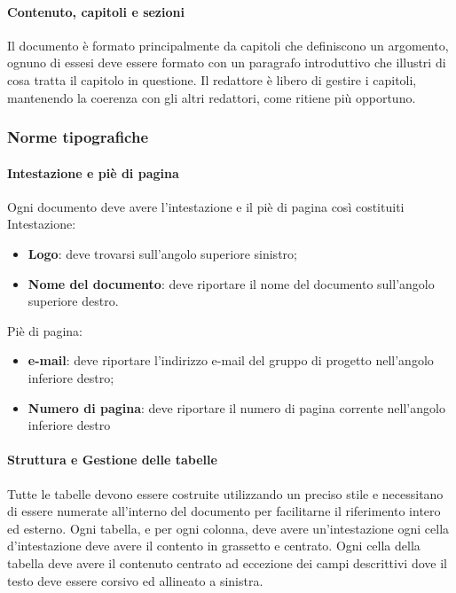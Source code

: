   \paragraph{Contenuto, capitoli e sezioni}
  Il documento è formato principalmente da capitoli che definiscono un argomento,
  ognuno di essesi deve essere formato con un paragrafo introduttivo che illustri
  di cosa tratta il capitolo in questione.
  Il redattore è libero di gestire i capitoli, mantenendo la coerenza con gli altri
  redattori, come ritiene più opportuno.
  \subsubsection{Norme tipografiche}
  \paragraph{Intestazione e piè di pagina}
  Ogni documento deve avere l'intestazione e il piè di pagina così costituiti
  Intestazione:
  \begin{itemize}
    \item \textbf{Logo}: deve trovarsi sull'angolo superiore sinistro;
    \item \textbf{Nome del documento}: deve riportare il nome del documento sull'angolo superiore destro.
  \end{itemize}
  Piè di pagina:
  \begin{itemize}
    \item \textbf{e-mail}: deve riportare l'indirizzo e-mail del gruppo di progetto
    nell'angolo inferiore destro;
    \item \textbf{Numero di pagina}: deve riportare il numero di pagina corrente
     nell'angolo inferiore destro
  \end{itemize}

  \paragraph{Struttura e Gestione delle tabelle}
  Tutte le tabelle devono essere costruite utilizzando un preciso stile e necessitano
  di essere numerate all'interno del documento per facilitarne il riferimento
  intero ed esterno.
  Ogni tabella, e per ogni colonna, deve avere un'intestazione ogni cella d'intestazione
  deve avere il contento in grassetto e centrato.
  Ogni cella della tabella deve avere il contenuto centrato ad eccezione dei campi
  descrittivi dove il testo deve essere corsivo ed allineato a sinistra.

